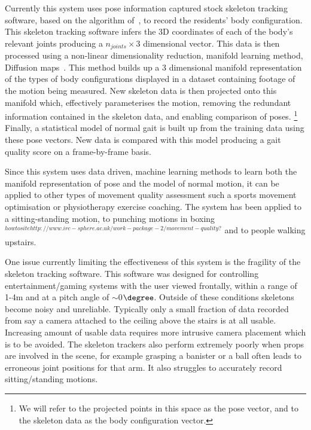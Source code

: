 \documentclass[11pt]{article} %
\begin{document}
Currently this system uses pose information captured stock skeleton tracking software, based on the algorithm of~\cite{Shotton2011}, to record the residents' body configuration. This skeleton tracking software infers the 3D coordinates of each of the body's relevant joints producing a $n_{joints} \times 3$ dimensional vector. This data is then processed using a non-linear dimensionality reduction, manifold learning method, Diffusion maps~\cite{Coifman2006}. This method builds up a 3 dimensional manifold representation of the types of body configurations displayed in a dataset containing footage of the motion being measured. New skeleton data is then projected onto this manifold which, effectively parameterises the motion, removing the redundant information contained in the skeleton data, and enabling comparison of poses. \footnote{We will refer to the projected points in this space as the pose vector, and to the skeleton data as the body configuration vector.} Finally, a statistical model of normal gait is built up from the training data using these pose vectors. New data is compared with this model producing a gait quality score on a frame-by-frame basis.

Since this system uses data driven, machine learning methods to learn both the manifold representation of pose and the model of normal motion, it can be applied to other types of movement quality assessment such a sports movement optimisation or physiotherapy exercise coaching. The system has been applied to a sitting-standing motion, to punching motions in boxing$^{how to site http://www.irc-sphere.ac.uk/work-package-2/movement-quality ?}$ and to people walking upstairs. 

One issue currently limiting the effectiveness of this system is the fragility of the skeleton tracking software. This software was designed for controlling entertainment/gaming systems with the user viewed frontally, within a range of 1-4m and at a pitch angle of $\sim$0$\degree$. Outside of these conditions skeletons become noisy and unreliable. Typically only a small fraction of data recorded from say a camera attached to the ceiling above the stairs is at all usable. Increasing amount of usable data requires more intrusive camera placement which is to be avoided. The skeleton trackers also perform extremely poorly when props are involved in the scene, for example grasping a banister or a ball often leads to erroneous joint positions for that arm. It also struggles to accurately record sitting/standing motions.
\end{document}

